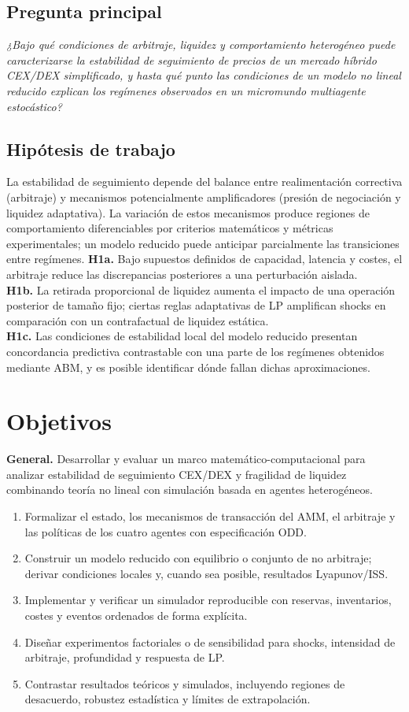 \documentclass[11pt,a4paper]{article}
\begin{document}
\subsection{Pregunta principal}
\emph{¿Bajo qué condiciones de arbitraje, liquidez y comportamiento heterogéneo puede caracterizarse la estabilidad de seguimiento de precios de un mercado híbrido CEX/DEX simplificado, y hasta qué punto las condiciones de un modelo no lineal reducido explican los regímenes observados en un micromundo multiagente estocástico?}
\subsection{Hipótesis de trabajo}
La estabilidad de seguimiento depende del balance entre realimentación correctiva (arbitraje) y mecanismos potencialmente amplificadores (presión de negociación y liquidez adaptativa). La variación de estos mecanismos produce regiones de comportamiento diferenciables por criterios matemáticos y métricas experimentales; un modelo reducido puede anticipar parcialmente las transiciones entre regímenes.
\textbf{H1a.} Bajo supuestos definidos de capacidad, latencia y costes, el arbitraje reduce las discrepancias posteriores a una perturbación aislada.\\
\textbf{H1b.} La retirada proporcional de liquidez aumenta el impacto de una operación posterior de tamaño fijo; ciertas reglas adaptativas de LP amplifican shocks en comparación con un contrafactual de liquidez estática.\\
\textbf{H1c.} Las condiciones de estabilidad local del modelo reducido presentan concordancia predictiva contrastable con una parte de los regímenes obtenidos mediante ABM, y es posible identificar dónde fallan dichas aproximaciones.
\section{Objetivos}
\textbf{General.} Desarrollar y evaluar un marco matemático-computacional para analizar estabilidad de seguimiento CEX/DEX y fragilidad de liquidez combinando teoría no lineal con simulación basada en agentes heterogéneos.
\begin{enumerate}[leftmargin=*,itemsep=2pt]
\item Formalizar el estado, los mecanismos de transacción del AMM, el arbitraje y las políticas de los cuatro agentes con especificación ODD.
\item Construir un modelo reducido con equilibrio o conjunto de no arbitraje; derivar condiciones locales y, cuando sea posible, resultados Lyapunov/ISS.
\item Implementar y verificar un simulador reproducible con reservas, inventarios, costes y eventos ordenados de forma explícita.
\item Diseñar experimentos factoriales o de sensibilidad para shocks, intensidad de arbitraje, profundidad y respuesta de LP.
\item Contrastar resultados teóricos y simulados, incluyendo regiones de desacuerdo, robustez estadística y límites de extrapolación.
\end{enumerate}
\end{document}
